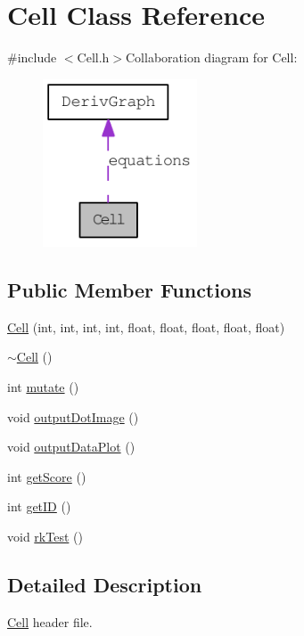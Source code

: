 \hypertarget{classCell}{
\section{Cell Class Reference}
\label{classCell}
}


{\ttfamily \#include $<$Cell.h$>$}Collaboration diagram for Cell:\nopagebreak
\begin{figure}[H]
\begin{center}
\leavevmode
\includegraphics[width=130pt]{classCell__coll__graph}
\end{center}
\end{figure}
\subsection*{Public Member Functions}
\begin{DoxyCompactItemize}
\item 
\hyperlink{classCell_af85b728fb894b346b654eea910958180}{Cell} (int, int, int, int, float, float, float, float, float)
\item 
\hyperlink{classCell_a9fa559f7a28e2b4336c6879ca09304d8}{$\sim$Cell} ()
\item 
int \hyperlink{classCell_a555fa98c5f1dc8d7c88c7a24f69994ff}{mutate} ()
\item 
void \hyperlink{classCell_a535ddddc0471fa874a0b22a54bd38c1a}{outputDotImage} ()
\item 
void \hyperlink{classCell_a8e117526c56dda4d0d56d840d1558835}{outputDataPlot} ()
\item 
int \hyperlink{classCell_a3fbb8b244cc5c516d0728a987d07bf0f}{getScore} ()
\item 
int \hyperlink{classCell_a6fb5e28360b3a6e53400af8b950f6203}{getID} ()
\item 
void \hyperlink{classCell_a23f164fa204f67b79256636bfdae1e75}{rkTest} ()
\end{DoxyCompactItemize}


\subsection{Detailed Description}
\hyperlink{classCell}{Cell} header file. 

